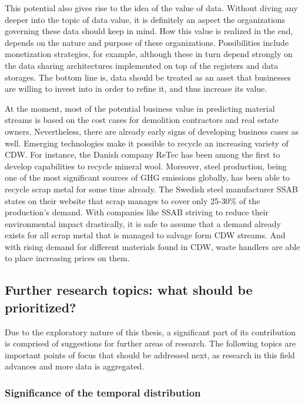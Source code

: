 \documentclass[english, 12pt, a4paper, sci, utf8, a-2b, online]{aaltothesis}
\begin{document}
This potential also gives rise to the idea of the
value of data. Without diving any deeper into the topic of data value, it is definitely an aspect the organizations governing these data should keep in mind. How this value is realized in the end,
depends on the nature and purpose of these organizations. Possibilities include monetization strategies, for example, although these in turn depend strongly on the data sharing architectures
implemented on top of the registers and data storages. The bottom line is, data should be treated as an asset that businesses are willing to invest into in order to refine it, and thus increase
its value.

At the moment, most of the potential business value in predicting material streams is based on the cost cases for demolition contractors and real estate owners. Nevertheless, there are already early
signs of developing business cases as well. Emerging technologies make it possible to recycle an increasing variety of CDW. For instance, the Danish company ReTec has been among the first to
develop capabilities to recycle mineral wool. Moreover, steel production, being one of the most significant sources of GHG emissions globally, has been able to recycle scrap metal for some time
already. The Swedish steel manufacturer SSAB states on their website that scrap manages to cover only 25-30\% of the production's demand. With companies like SSAB striving to reduce their environmental
impact drastically, it is safe to assume that a demand already exists for all scrap metal that is managed to salvage form CDW streams. And with rising demand for different materials found in CDW,
waste handlers are able to place increasing prices on them.

\subsection{Further research topics: what should be prioritized?}

Due to the exploratory nature of this thesis, a significant part of its contribution is comprised of suggestions for further areas of research. The following topics are important points of focus
that should be addressed next, as research in this field advances and more data is aggregated.

\subsubsection{Significance of the temporal distribution}
\end{document}
